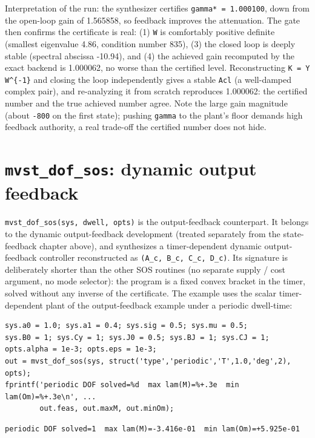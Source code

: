 \documentclass[11pt,oneside]{report}
\newcommand{\code}[1]{\texttt{#1}}
\begin{document}
Interpretation of the run: the synthesizer certifies \code{gamma* = 1.000100}, down from the
open-loop gain of 1.565858, so feedback improves the attenuation.
The gate then confirms the certificate is real: (1) \code{W} is comfortably positive
definite (smallest eigenvalue 4.86, condition number 835), (3) the closed loop
is deeply stable (spectral abscissa -10.94), and (4) the achieved gain
recomputed by the exact backend is 1.000062, no worse than the certified level.
Reconstructing \code{K = Y W\^{}\{-1\}} and closing the loop independently gives a stable
\code{Acl} (a well-damped complex pair), and re-analyzing it from scratch reproduces
1.000062: the certified number and the true achieved number agree. Note the
large gain magnitude (about \code{-800} on the first state); pushing \code{gamma} to the
plant's floor demands high feedback authority, a real trade-off the certified
number does not hide.

\hypertarget{mvst_dof_sos-dynamic-output-feedback}{%
\section{\texorpdfstring{\code{mvst\_dof\_sos}: dynamic output feedback}{mvst\_dof\_sos: dynamic output feedback}}\label{mvst_dof_sos-dynamic-output-feedback}}

\code{mvst\_dof\_sos(sys, dwell, opts)} is the output-feedback counterpart. It belongs
to the dynamic output-feedback development (treated separately from the
state-feedback chapter above), and synthesizes a timer-dependent dynamic
output-feedback controller reconstructed as \code{(A\_c, B\_c, C\_c, D\_c)}. Its signature
is deliberately shorter than the other SOS routines (no separate supply / cost
argument, no mode selector): the program is a fixed convex bracket in the timer,
solved without any inverse of the certificate. The example uses the scalar
timer-dependent plant of the output-feedback example under a periodic dwell-time:

\begin{lstlisting}[style=matlabstyle]
sys.a0 = 1.0; sys.a1 = 0.4; sys.sig = 0.5; sys.mu = 0.5;
sys.B0 = 1; sys.Cy = 1; sys.J0 = 0.5; sys.BJ = 1; sys.CJ = 1;
opts.alpha = 1e-3; opts.eps = 1e-3;
out = mvst_dof_sos(sys, struct('type','periodic','T',1.0,'deg',2), opts);
fprintf('periodic DOF solved=%d  max lam(M)=%+.3e  min lam(Om)=%+.3e\n', ...
        out.feas, out.maxM, out.minOm);
\end{lstlisting}

\begin{lstlisting}[style=outputstyle]
periodic DOF solved=1  max lam(M)=-3.416e-01  min lam(Om)=+5.925e-01
\end{lstlisting}
\end{document}
